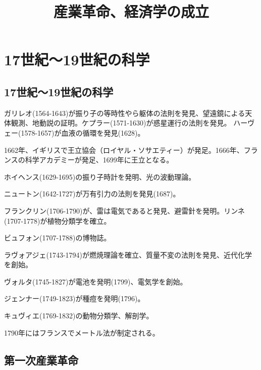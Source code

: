 \documentclass[uplatex,dvipdfmx]{jsarticle} \usepackage{mystyle}%
\title{産業革命、経済学の成立}
\begin{document}
\maketitle

\else\chapter{17世紀〜19世紀の科学}\fi


\section{17世紀〜19世紀の科学}


ガリレオ(1564-1643)が振り子の等時性やら躯体の法則を発見、望遠鏡による天体観測、地動説の証明。ケプラー(1571-1630)が惑星運行の法則を発見。
ハーヴェー(1578-1657)が血液の循環を発見(1628)。

1662年、イギリスで王立協会（ロイヤル・ソサエティー）が発足。1666年、フランスの科学アカデミーが発足、1699年に王立となる。


ホイヘンス(1629-1695)の振り子時計を発明、光の波動理論。

ニュートン(1642-1727)が万有引力の法則を発見(1687)。

フランクリン(1706-1790)が、雷は電気であると発見、避雷針を発明。リンネ(1707-1778)が植物分類学を確立。

ビュフォン(1707-1788)の博物誌。

ラヴォアジェ(1743-1794)が燃焼理論を確立、質量不変の法則を発見、近代化学を創始。

ヴォルタ(1745-1827)が電池を発明(1799)、電気学を創始。

ジェンナー(1749-1823)が種痘を発明(1796)。

キュヴィエ(1769-1832)の動物分類学、解剖学。

1790年にはフランスでメートル法が制定される。


\section{第一次産業革命}
\end{document}
